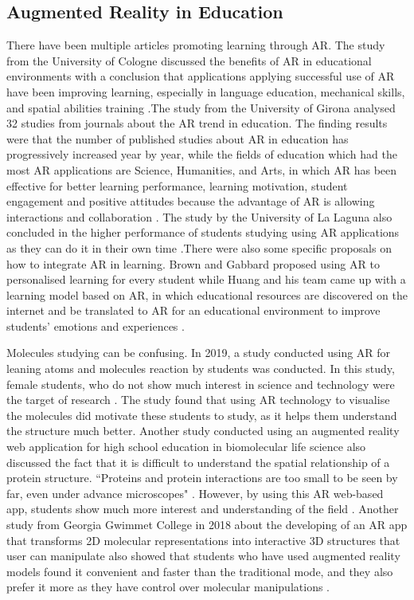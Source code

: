 \subsection{Augmented Reality in Education}
There have been multiple articles promoting learning through AR. The study from the University of Cologne discussed the benefits of AR in educational environments with a conclusion that applications applying successful use of AR have been improving learning, especially in language education, mechanical skills, and spatial abilities training \parencite{diegmann_benefits_2015}.The study from the University of Girona analysed 32 studies from journals about the AR trend in education. The finding results were that the number of published studies about AR in education has progressively increased year by year, while the fields of education which had the most AR applications are Science, Humanities, and Arts, in which AR has been effective for better learning performance, learning motivation, student engagement and positive attitudes because the advantage of AR is allowing interactions and collaboration \parencite{bacca_augmented_2015}. The study by the University of La Laguna also concluded in the higher performance of students studying using AR applications as they can do it in their own time \parencite{martin-gutierrez_augmented_2015}.There were also some specific proposals on how to integrate AR in learning. Brown and Gabbard proposed using AR to personalised learning for every student \parencite{brown_interactive_2015} while Huang and his team came up with a learning model based on AR, in which educational resources are discovered on the internet and be translated to AR for an educational environment to improve students’ emotions and experiences \parencite{huang_animating_2016}.

Molecules studying can be confusing. In 2019, a study conducted using AR for leaning atoms and molecules reaction by students was conducted. In this study, female students, who do not show much interest in science and technology were the target of research \parencite{ewais_usability_2019}. The study found that using AR technology to visualise the molecules did motivate these students to study, as it helps them understand the structure much better. Another study conducted using an augmented reality web application for high school education in biomolecular life science also discussed the fact that it is difficult to understand the spatial relationship of a protein structure. “Proteins and protein interactions are too small to be seen by far, even under advance microscopes" \parencite{nickels_proteinscanar_2012-1}. However, by using this AR web-based app, students show much more interest and understanding of the field \parencite{nickels_proteinscanar_2012-1}. Another study from Georgia Gwimmet College in 2018 about the developing of an AR app that transforms 2D molecular representations into interactive 3D structures that user can manipulate also showed that students who have used augmented reality models found it convenient and faster than the traditional mode, and they also prefer it more as they have control over molecular manipulations \parencite{behmke_augmented_2018}.

